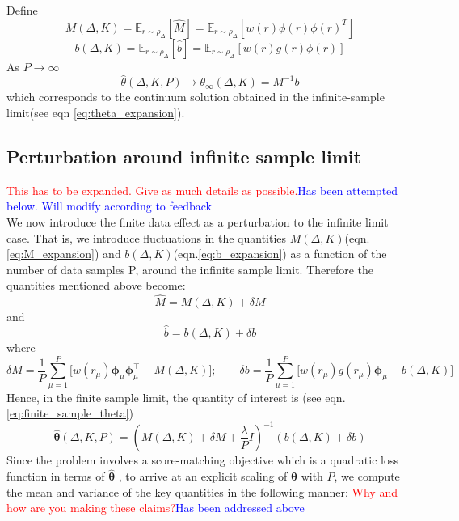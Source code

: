 \documentclass[11pt,a4paper]{article}
\theoremstyle{remark}
\newcommand{\E}{\mathbb{E}}
\newcommand{\bphi}{\boldsymbol{\phi}}
\newcommand{\btheta}{\boldsymbol{\theta}}
\newcommand{\del}{\delta}
\def\sgp#1{{\sf\textcolor{red}{#1}}}
\def\ant#1{{\sf\textcolor{blue}{#1}}}
\begin{document}
\begin{onehalfspace}
Define
\begin{equation}
    M(\Delta, K) = \E_{r\sim \rho_\Delta}[\hat{M}] = \E_{r\sim\rho_\Delta}[w(r)\phi(r)\phi(r)^T]
\end{equation}    
\begin{equation}
    b(\Delta, K) = \E_{r\sim\rho_\Delta}[\hat{b}] = \E_{r\sim\rho_\Delta}[w(r)g(r)\phi(r)]
\end{equation}
As  $P\to\infty$
\begin{equation}
    \hat \theta (\Delta, K, P) \to \theta_\infty(\Delta, K) = M^{-1}b
\end{equation}
which corresponds to the continuum solution obtained in the infinite-sample limit(see eqn \eqref{eq:theta_expansion}).


\subsection{Perturbation around infinite sample limit}\label{subsec:deterministicPerturb}
\sgp{This has to be expanded. Give as much details as possible.}\ant{Has been attempted below. Will modify according to feedback}\\
We now introduce the finite data effect as a perturbation to the infinite limit case. That is, we introduce fluctuations in the quantities $M(\Delta,K)$(eqn.\ref{eq:M_expansion}) and $b(\Delta,K)$(eqn.\ref{eq:b_expansion}) as a function of the number of data samples P, around the infinite sample limit. Therefore the quantities mentioned above become:
\begin{equation}\label{eq:finite_m_expression} 
    \hat{M} = M(\Delta, K) + \del M 
\end{equation}
and
\begin{equation}\label{eq:finite_b_expression}
    \hat{b} = b(\Delta, K) + \del b
\end{equation}
where
\begin{equation}
    \del M = \frac{1}{P}\sum_{\mu=1}^{P} \big[w(r_\mu)\bphi_\mu \bphi_\mu^\top - M(\Delta,K)\big];\qquad \del b = \frac{1}{P}\sum_{\mu=1}^{P} \big[w(r_\mu)g(r_\mu)\bphi_\mu - b(\Delta,K)\big] \label{eq:delM_delb_expression}
\end{equation}
Hence, in the finite sample limit, the quantity of interest is (see eqn.\ref{eq:finite_sample_theta})
\begin{equation}\label{eq:theta_hat}
    \hat{\btheta}(\Delta,K,P) = (M(\Delta, K)+\del M+\frac{\lambda}{P}I)^{-1}(b(\Delta, K) +\del b)
\end{equation}
Since the problem involves a score-matching objective which is a quadratic loss function in terms of $\hat{\btheta}$ , to arrive at an explicit scaling of $\hat{\btheta}$ with $P$, we compute the mean and variance of the key quantities in the following manner:
\sgp{Why and how are you making these claims?}\ant{Has been addressed above}


\end{onehalfspace}
\end{document}
